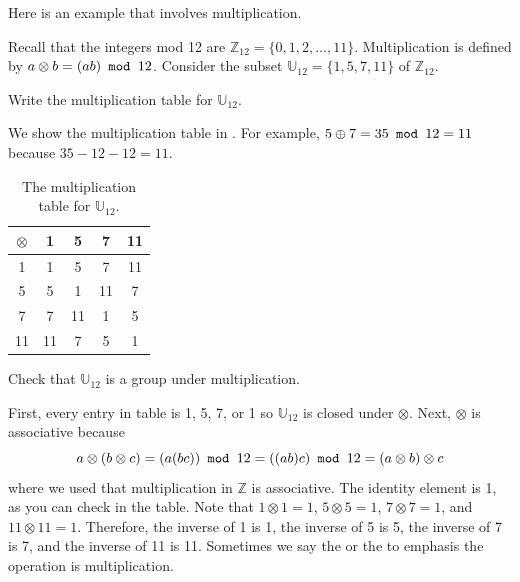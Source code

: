Here is an example that involves multiplication.

\begin{exam}
\label{exam_mult_gp_mod12}
    Recall that the integers mod 12 are $\mathbb{Z}_{12} =\{0,1,2,\ldots, 11\}$.  Multiplication is defined by $a \otimes b = (ab) \texttt{ mod } 12$.  Consider the subset $\mathbb{U}_{12} = \{1, 5, 7, 11\}$ of $\mathbb{Z}_{12}$.
        \begin{apart}
            \item Write the multiplication table for $\mathbb{U}_{12}$.
                \begin{soln}
                    We show the multiplication table in .  For example, $5 \oplus 7 = 35 \texttt{ mod } 12 = 11$ because $35-12-12=11$.
                        \begin{table}[hbtp]
                            \centering
                            \begin{tabular}{c|cccc} 
                                 $\otimes$ & 1 & 5 & 7 & 11 \\ \hline
                                 1 & 1 & 5 & 7 & 11 \\
                                 5 & 5 & 1 & 11 & 7 \\
                                 7 & 7 & 11 & 1 & 5 \\
                                 11 & 11 & 7 & 5 & 1 
                            \end{tabular}
                            \caption{The multiplication table for $\mathbb{U}_{12}$.}
                            \label{tab_mult_units_mod12}
                        \end{table}
                \end{soln}
            \item Check that $\mathbb{U}_{12}$ is a group under multiplication.
                \begin{soln}
                    First, every entry in table is 1, 5, 7, or 1 so $\mathbb{U}_{12}$ is closed under $\otimes$.  Next, $\otimes$ is associative because $$a \otimes (b \otimes c) = (a(bc)) \texttt{ mod } 12 =  ((ab)c) \texttt{ mod } 12 = (a \otimes b) \otimes c$$ where we used that multiplication in $\mathbb{Z}$ is associative.  The identity element is 1, as you can check in the table.  Note that $1\otimes 1 = 1$, $5 \otimes 5 = 1$, $7 \otimes 7 = 1$, and $11 \otimes 11 = 1$.  Therefore, the inverse of 1 is 1, the inverse of 5 is 5, the inverse of 7 is 7, and the inverse of 11 is 11.  Sometimes we say the  or the  to emphasis the operation is multiplication.
                \end{soln}
        \end{apart}
\end{exam}

